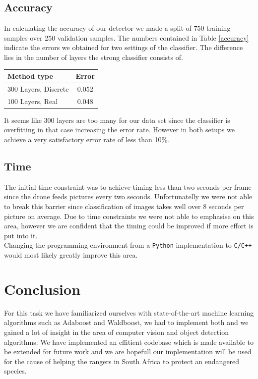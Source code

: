 \documentclass[11pt]{article}
\begin{document}
\subsection{Accuracy}
In calculating the accuracy of our detector we made a split of 750 training samples over 250 validation samples. The numbers contained in Table \ref{accuracy} indicate the errors we obtained for two settings of the classifier. The difference lies in the number of layers the strong classifier consists of.\\
\begin{center}
\begin{tabular}{l|c}
	Method type          & \textbf{Error} \\
	\hline
	300 Layers, Discrete & 0.052 \\
	100 Layers, Real     & 0.048 \\
\end{tabular}
\label{accuracy}
\end{center}
It seems like 300 layers are too many for our data set since the classifier is overfitting in that case increasing the error rate. However in both setups we achieve a very satisfactory error rate of less than 10\%.

\subsection{Time}
The initial time constraint was to achieve timing less than two seconds per frame since the drone feeds pictures every two seconds. Unfortunatelly we were not able to break this barrier since classification of images takes well over 8 seconds per picture on average. Due to time constraints we were not able to emphasise on this area, however we are confident that the timing could be improved if more effort is put into it.\\
Changing the programming environment from a \texttt{Python} implementation to \texttt{C/C++} would most likely greatly improve this area.

\section{Conclusion}
For this task we have familiarized ourselves with state-of-the-art machine learning algorithms such as Adaboost and Waldboost, we had to implement both and we gained a lot of insight in the area of computer vision and object detection algorithms. We have implemented an effitient codebase which is made available to be extended for future work and we are hopefull our implementation will be used for the cause of helping the rangers in South Africa to protect an endangered species.  
\end{document}
